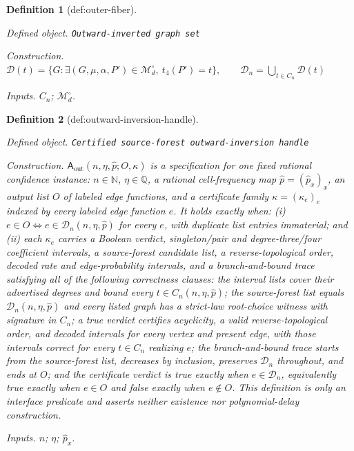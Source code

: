 \documentclass{article}
\newtheorem{definition}{Definition}
\begin{document}
\begin{definition}[def:outer-fiber]\label{def:outer-fiber}
\par\smallskip\noindent\emph{Defined object.} \texttt{Outward-\allowbreak{}inverted graph set}
\par\smallskip\noindent\emph{Construction.} \(\mathcal D(t)=\{G:\exists(G,\mu,\alpha,P')\in\mathcal M_d^\circ,\ t_4(P')=t\},\qquad \mathcal D_n=\bigcup_{t\in C_n}\mathcal D(t)\)
\par\smallskip\noindent\emph{Inputs.} \(C_n\); \(\mathcal M_d^\circ\).
\end{definition}

\begin{definition}[def:outward-inversion-handle]\label{def:outward-inversion-handle}
\par\smallskip\noindent\emph{Defined object.} \texttt{Certified source-\allowbreak{}forest outward-\allowbreak{}inversion handle}
\par\smallskip\noindent\emph{Construction.} \(\mathsf A_{\mathrm{out}}(n,\eta,\widehat p;O,\kappa)\) is a specification for one fixed rational confidence instance: \(n\in\mathbb N\), \(\eta\in\mathbb Q\), a rational cell-frequency map \(\widehat p=(\widehat p_x)_x\), an output list \(O\) of labeled edge functions, and a certificate family \(\kappa=(\kappa_e)_e\) indexed by every labeled edge function \(e\). It holds exactly when: (i) \(e\in O\Longleftrightarrow e\in\mathcal D_n(n,\eta,\widehat p)\) for every \(e\), with duplicate list entries immaterial; and (ii) each \(\kappa_e\) carries a Boolean verdict, singleton/pair and degree-three/four coefficient intervals, a source-forest candidate list, a reverse-topological order, decoded rate and edge-probability intervals, and a branch-and-bound trace satisfying all of the following correctness clauses: the interval lists cover their advertised degrees and bound every \(t\in C_n(n,\eta,\widehat p)\); the source-forest list equals \(\mathcal D_n(n,\eta,\widehat p)\) and every listed graph has a strict-law root-choice witness with signature in \(C_n\); a true verdict certifies acyclicity, a valid reverse-topological order, and decoded intervals for every vertex and present edge, with those intervals correct for every \(t\in C_n\) realizing \(e\); the branch-and-bound trace starts from the source-forest list, decreases by inclusion, preserves \(\mathcal D_n\) throughout, and ends at \(O\); and the certificate verdict is true exactly when \(e\in\mathcal D_n\), equivalently true exactly when \(e\in O\) and false exactly when \(e\notin O\). This definition is only an interface predicate and asserts neither existence nor polynomial-delay construction.
\par\smallskip\noindent\emph{Inputs.} \(n\); \(\eta\); \(\widehat p_x\).
\end{definition}
\end{document}
